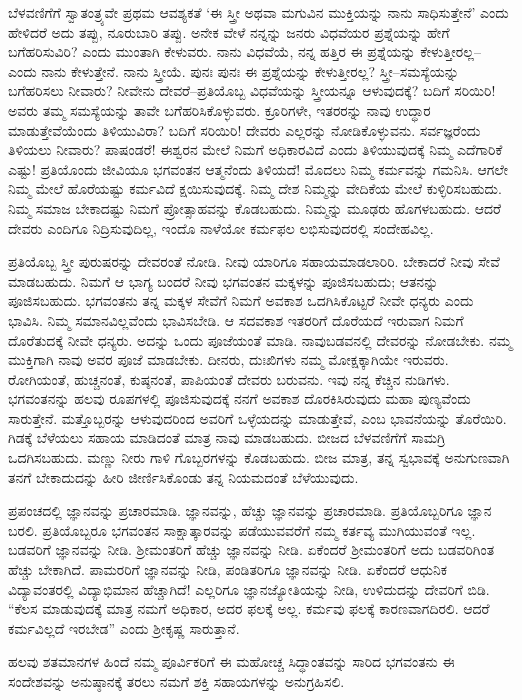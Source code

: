 ಬೆಳವಣಿಗೆಗೆ ಸ್ವಾತಂತ್ರ್ಯವೇ ಪ್ರಥಮ ಆವಶ್ಯಕತೆ ‘ಈ ಸ್ತ್ರೀ ಅಥವಾ ಮಗುವಿನ ಮುಕ್ತಿಯನ್ನು ನಾನು ಸಾಧಿಸುತ್ತೇನೆ’ ಎಂದು ಹೇಳಿದರೆ ಅದು ತಪ್ಪು, ನೂರುಬಾರಿ ತಪ್ಪು. ಅನೇಕ ವೇಳೆ ನನ್ನನ್ನು ಜನರು ವಿಧವೆಯರ ಪ್ರಶ್ನೆಯನ್ನು ಹೇಗೆ ಬಗೆಹರಿಸುವಿರಿ? ಎಂದು ಮುಂತಾಗಿ ಕೇಳುವರು. ನಾನು ವಿಧವೆಯೆ, ನನ್ನ ಹತ್ತಿರ ಈ ಪ್ರಶ್ನೆಯನ್ನು ಕೇಳುತ್ತೀರಲ್ಲ– ಎಂದು ನಾನು ಕೇಳುತ್ತೇನೆ. ನಾನು ಸ್ತ್ರೀಯೆ. ಪುನಃ ಪುನಃ ಈ ಪ್ರಶ್ನೆಯನ್ನು ಕೇಳುತ್ತೀರಲ್ಲ? ಸ್ತ್ರೀ–ಸಮಸ್ಯೆಯನ್ನು ಬಗೆಹರಿಸಲು ನೀವಾರು? ನೀವೇನು ದೇವರೆ–ಪ್ರತಿಯೊಬ್ಬ ವಿಧವೆಯನ್ನು ಸ್ತ್ರೀಯನ್ನೂ ಆಳುವುದಕ್ಕೆ? ಬದಿಗೆ ಸರಿಯಿರಿ! ಅವರು ತಮ್ಮ ಸಮಸ್ಯೆಯನ್ನು ತಾವೇ ಬಗೆಹರಿಸಿಕೊಳ್ಳುವರು. ಕ್ರೂರಿಗಳೇ, ಇತರರನ್ನು ನಾವು ಉದ್ಧಾರ ಮಾಡುತ್ತೇವೆಯೆಂದು ತಿಳಿಯುವಿರಾ? ಬದಿಗೆ ಸರಿಯಿರಿ! ದೇವರು ಎಲ್ಲರನ್ನು ನೋಡಿಕೊಳ್ಳುವನು. ಸರ್ವಜ್ಞರೆಂದು ತಿಳಿಯಲು ನೀವಾರು? ಪಾಷಂಡರೆ! ಈಶ್ವರನ ಮೇಲೆ ನಿಮಗೆ ಅಧಿಕಾರವಿದೆ ಎಂದು ತಿಳಿಯುವುದಕ್ಕೆ ನಿಮ್ಮ ಎದೆಗಾರಿಕೆ ಎಷ್ಟು! ಪ್ರತಿಯೊಂದು ಜೀವಿಯೂ ಭಗವಂತನ ಆತ್ಮನೆಂದು ತಿಳಿಯದೆ! ಮೊದಲು ನಿಮ್ಮ ಕರ್ಮವನ್ನು ಗಮನಿಸಿ. ಆಗಲೇ ನಿಮ್ಮ ಮೇಲೆ ಹೊರೆಯಷ್ಟು ಕರ್ಮವಿದೆ ಕ್ಷಯಿಸುವುದಕ್ಕೆ. ನಿಮ್ಮ ದೇಶ ನಿಮ್ಮನ್ನು ವೇದಿಕೆಯ ಮೇಲೆ ಕುಳ್ಳಿರಿಸಬಹುದು. ನಿಮ್ಮ ಸಮಾಜ ಬೇಕಾದಷ್ಟು ನಿಮಗೆ ಪ್ರೋತ್ಸಾಹವನ್ನು ಕೊಡಬಹುದು. ನಿಮ್ಮನ್ನು ಮೂಢರು ಹೊಗಳಬಹುದು. ಆದರೆ ದೇವರು ಎಂದಿಗೂ ನಿದ್ರಿಸುವುದಿಲ್ಲ, ಇಂದೊ ನಾಳೆಯೋ ಕರ್ಮಫಲ ಲಭಿಸುವುದರಲ್ಲಿ ಸಂದೇಹವಿಲ್ಲ.

ಪ್ರತಿಯೊಬ್ಬ ಸ್ತ್ರೀ ಪುರುಷರನ್ನು ದೇವರಂತೆ ನೋಡಿ. ನೀವು ಯಾರಿಗೂ ಸಹಾಯಮಾಡಲಾರಿರಿ. ಬೇಕಾದರೆ ನೀವು ಸೇವೆ ಮಾಡಬಹುದು. ನಿಮಗೆ ಆ ಭಾಗ್ಯ ಬಂದರೆ ನೀವು ಭಗವಂತನ ಮಕ್ಕಳನ್ನು ಪೂಜಿಸಬಹುದು; ಆತನನ್ನು ಪೂಜಿಸಬಹುದು. ಭಗವಂತನು ತನ್ನ ಮಕ್ಕಳ ಸೇವೆಗೆ ನಿಮಗೆ ಅವಕಾಶ ಒದಗಿಸಿಕೊಟ್ಟರೆ ನೀವೇ ಧನ್ಯರು ಎಂದು ಭಾವಿಸಿ. ನಿಮ್ಮ ಸಮಾನವಿಲ್ಲವೆಂದು ಭಾವಿಸಬೇಡಿ. ಆ ಸದವಕಾಶ ಇತರರಿಗೆ ದೊರೆಯದೆ ಇರುವಾಗ ನಿಮಗೆ ದೊರೆತುದಕ್ಕೆ ನೀವೇ ಧನ್ಯರು. ಅದನ್ನು ಒಂದು ಪೂಜೆಯಂತೆ ಮಾಡಿ. ನಾವು\break ಬಡವನಲ್ಲಿ ದೇವರನ್ನು ನೋಡಬೇಕು. ನಮ್ಮ ಮುಕ್ತಿಗಾಗಿ ನಾವು ಅವರ ಪೂಜೆ ಮಾಡಬೇಕು. ದೀನರು, ದುಃಖಿಗಳು ನಮ್ಮ ಮೋಕ್ಷಕ್ಕಾಗಿಯೇ ಇರುವರು. ರೋಗಿಯಂತೆ, ಹುಚ್ಚನಂತೆ, ಕುಷ್ಠನಂತೆ, ಪಾಪಿಯಂತೆ ದೇವರು ಬರುವನು. ಇವು ನನ್ನ ಕೆಚ್ಚಿನ ನುಡಿಗಳು. ಭಗವಂತನನ್ನು ಹಲವು ರೂಪಗಳಲ್ಲಿ ಪೂಜಿಸುವುದಕ್ಕೆ ನನಗೆ ಅವಕಾಶ ದೊರಕಿಸಿರುವುದು ಮಹಾ ಪುಣ್ಯವೆಂದು ಸಾರುತ್ತೇನೆ. ಮತ್ತೊಬ್ಬರನ್ನು ಆಳುವುದರಿಂದ ಅವರಿಗೆ ಒಳ್ಳೆಯದನ್ನು ಮಾಡುತ್ತೇವೆ, ಎಂಬ ಭಾವನೆಯನ್ನು ತೊರೆಯಿರಿ. ಗಿಡಕ್ಕೆ ಬೆಳೆಯಲು ಸಹಾಯ ಮಾಡಿದಂತೆ ಮಾತ್ರ ನಾವು ಮಾಡಬಹುದು. ಬೀಜದ ಬೆಳವಣಿಗೆಗೆ ಸಾಮಗ್ರಿ ಒದಗಿಸಬಹುದು. ಮಣ್ಣು ನೀರು ಗಾಳಿ ಗೊಬ್ಬರಗಳನ್ನು ಕೊಡಬಹುದು. ಬೀಜ ಮಾತ್ರ, ತನ್ನ ಸ್ವಭಾವಕ್ಕೆ ಅನುಗುಣವಾಗಿ ತನಗೆ ಬೇಕಾದುದನ್ನು ಹೀರಿ ಜೀರ್ಣಿಸಿಕೊಂಡು ತನ್ನ ನಿಯಮದಂತೆ ಬೆಳೆಯುವುದು.

ಪ್ರಪಂಚದಲ್ಲಿ ಜ್ಞಾನವನ್ನು ಪ್ರಚಾರಮಾಡಿ. ಜ್ಞಾನವನ್ನು, ಹೆಚ್ಚು ಜ್ಞಾನವನ್ನು ಪ್ರಚಾರಮಾಡಿ. ಪ್ರತಿಯೊಬ್ಬರಿಗೂ ಜ್ಞಾನ ಬರಲಿ. ಪ್ರತಿಯೊಬ್ಬರೂ ಭಗವಂತನ ಸಾಕ್ಷಾತ್ಕಾರವನ್ನು ಪಡೆಯುವವರೆಗೆ ನಮ್ಮ ಕರ್ತವ್ಯ ಮುಗಿಯುವಂತೆ ಇಲ್ಲ. ಬಡವರಿಗೆ ಜ್ಞಾನವನ್ನು ನೀಡಿ. ಶ‍್ರೀಮಂತರಿಗೆ ಹೆಚ್ಚು ಜ್ಞಾನವನ್ನು ನೀಡಿ. ಏಕೆಂದರೆ ಶ‍್ರೀಮಂತರಿಗೆ ಅದು ಬಡವರಿ\-ಗಿಂತ ಹೆಚ್ಚು ಬೇಕಾಗಿದೆ. ಪಾಮರರಿಗೆ ಜ್ಞಾನವನ್ನು ನೀಡಿ, ಪಂಡಿತರಿಗೂ ಜ್ಞಾನವನ್ನು ನೀಡಿ. ಏಕೆಂದರೆ ಆಧುನಿಕ ವಿದ್ಯಾವಂತರಲ್ಲಿ ವಿದ್ಯಾಭಿಮಾನ ಹೆಚ್ಚಾಗಿದೆ! ಎಲ್ಲರಿಗೂ ಜ್ಞಾನಜ್ಯೋತಿಯನ್ನು ನೀಡಿ, ಉಳಿದುದನ್ನು ದೇವರಿಗೆ ಬಿಡಿ. “ಕೆಲಸ ಮಾಡುವುದಕ್ಕೆ ಮಾತ್ರ ನಮಗೆ ಅಧಿಕಾರ, ಅದರ ಫಲಕ್ಕೆ ಅಲ್ಲ. ಕರ್ಮವು ಫಲಕ್ಕೆ ಕಾರಣವಾಗದಿರಲಿ. ಆದರೆ ಕರ್ಮವಿಲ್ಲದೆ ಇರಬೇಡ” ಎಂದು ಶ‍್ರೀಕೃಷ್ಣ ಸಾರುತ್ತಾನೆ.

ಹಲವು ಶತಮಾನಗಳ ಹಿಂದೆ ನಮ್ಮ ಪೂರ್ವಿಕರಿಗೆ ಈ ಮಹೋಚ್ಚ ಸಿದ್ಧಾಂತವನ್ನು ಸಾರಿದ ಭಗವಂತನು ಈ ಸಂದೇಶವನ್ನು ಅನುಷ್ಠಾನಕ್ಕೆ ತರಲು ನಮಗೆ ಶಕ್ತಿ ಸಹಾಯಗಳನ್ನು ಅನುಗ್ರಹಿಸಲಿ.

